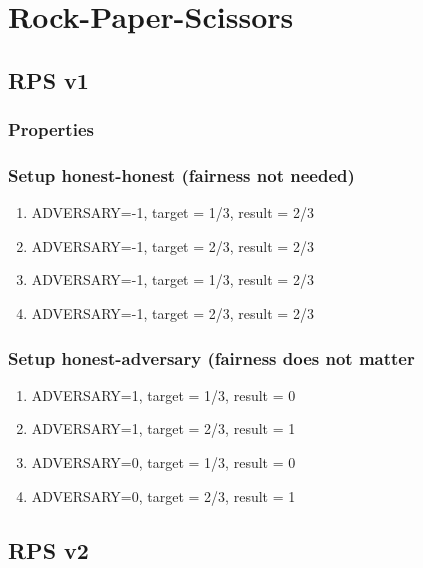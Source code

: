 \documentclass{article}
\begin{document}
\javastyle

\tableofcontents


\section{Rock-Paper-Scissors}

\subsection{RPS v1}



\subsubsection{Properties}



\subsubsection{Setup honest-honest (fairness not needed)}

\begin{enumerate}
\item ADVERSARY=-1, target = 1/3, result = 2/3
\item ADVERSARY=-1, target = 2/3, result = 2/3
\item ADVERSARY=-1, target = 1/3, result = 2/3
\item ADVERSARY=-1, target = 2/3, result = 2/3
\end{enumerate}

\subsubsection{Setup honest-adversary (fairness does not matter}

\begin{enumerate}
\item ADVERSARY=1, target = 1/3, result = 0
\item ADVERSARY=1, target = 2/3, result = 1
\item ADVERSARY=0, target = 1/3, result = 0
\item ADVERSARY=0, target = 2/3, result = 1
\end{enumerate}


\subsection{RPS v2}
\end{document}
